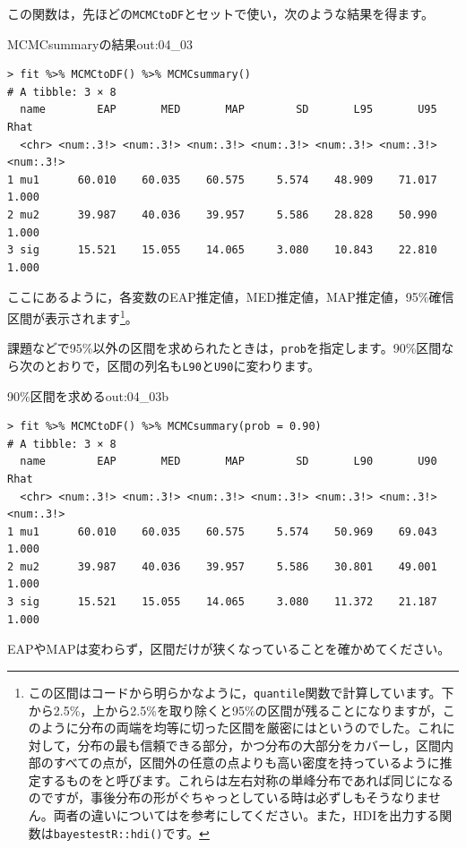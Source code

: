 \documentclass{ltjsbook}
\begin{document}
この関数は，先ほどの\verb|MCMCtoDF|とセットで使い，次のような結果を得ます。
\begin{Rscreen}{MCMCsummaryの結果}{out:04_03}
	\begin{verbatim}
> fit %>% MCMCtoDF() %>% MCMCsummary()
# A tibble: 3 × 8
  name        EAP       MED       MAP        SD       L95       U95      Rhat
  <chr> <num:.3!> <num:.3!> <num:.3!> <num:.3!> <num:.3!> <num:.3!> <num:.3!>
1 mu1      60.010    60.035    60.575     5.574    48.909    71.017     1.000
2 mu2      39.987    40.036    39.957     5.586    28.828    50.990     1.000
3 sig      15.521    15.055    14.065     3.080    10.843    22.810     1.000
  \end{verbatim}
\end{Rscreen}
ここにあるように，各変数のEAP推定値，MED推定値，MAP推定値，95\%確信区間が表示されます\footnote{この区間はコードから明らかなように，\verb|quantile|関数で計算しています。下から2.5\%，上から2.5\%を取り除くと95\%の区間が残ることになりますが，このように分布の両端を均等に切った区間を厳密にはというのでした。これに対して，分布の最も信頼できる部分，かつ分布の大部分をカバーし，区間内部のすべての点が，区間外の任意の点よりも高い密度を持っているように推定するものをと呼びます。これらは左右対称の単峰分布であれば同じになるのですが，事後分布の形がぐちゃっとしている時は必ずしもそうなりません。両者の違いについては\textcite{Maeda2017}を参考にしてください。また，HDIを出力する関数は\verb|bayestestR::hdi()|です。}。

課題などで95\%以外の区間を求められたときは，\verb|prob|を指定します。90\%区間なら次のとおりで，区間の列名も\verb|L90|と\verb|U90|に変わります。
\begin{Rscreen}{90\%区間を求める}{out:04_03b}
	\begin{verbatim}
> fit %>% MCMCtoDF() %>% MCMCsummary(prob = 0.90)
# A tibble: 3 × 8
  name        EAP       MED       MAP        SD       L90       U90      Rhat
  <chr> <num:.3!> <num:.3!> <num:.3!> <num:.3!> <num:.3!> <num:.3!> <num:.3!>
1 mu1      60.010    60.035    60.575     5.574    50.969    69.043     1.000
2 mu2      39.987    40.036    39.957     5.586    30.801    49.001     1.000
3 sig      15.521    15.055    14.065     3.080    11.372    21.187     1.000
  \end{verbatim}
\end{Rscreen}
EAPやMAPは変わらず，区間だけが狭くなっていることを確かめてください。
\end{document}
